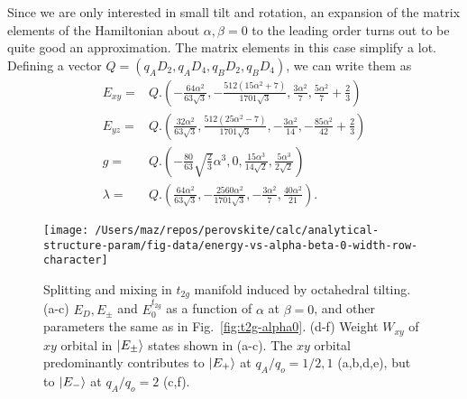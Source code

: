 \documentclass[a4paper,prb,twocolumn]{revtex4-1}  %
\begin{document}
Since we are only interested in small tilt and rotation,
an expansion of the matrix elements of the Hamiltonian about 
${\alpha,\beta=0}$
to the leading order turns out to be quite good an approximation.
The matrix elements in this case simplify a lot.
Defining a vector ${Q = \left( q_A D_2, q_A D_4, q_B D_2,q_B D_4  \right)}$,
 we can write them as
\begin{align}
E_{xy}=& Q.
\left(-\frac{64 \alpha ^2}{63 \sqrt{3}},-\frac{512 \left(15 \alpha ^2+7\right)}{1701 \sqrt{3}},\frac{3\alpha ^2}{7} ,\frac{5 \alpha ^2}{7}+\frac{2}{3}\right)\\
E_{yz}=& Q.
\left(\frac{32 \alpha ^2}{63 \sqrt{3}},\frac{512 \left(25 \alpha ^2-7\right)}{1701 \sqrt{3}},-\frac{3 \alpha ^2}{14},-\frac{85 \alpha ^2}{42}+\frac{2}{3}\right)\\
g=& Q.
\left(-\frac{80}{63} \sqrt{\frac{2}{3}} \alpha ^3,0,\frac{15 \alpha ^3}{14 \sqrt{2}},\frac{5 \alpha ^3}{2 \sqrt{2}}\right)\\
\lambda=& Q.
\left(\frac{64 \alpha ^2}{63 \sqrt{3}},-\frac{2560 \alpha ^2}{1701 \sqrt{3}},-\frac{3 \alpha ^2}{7},\frac{40 \alpha ^2}{21}\right).
\end{align}





\begin{figure}[htbp]
\begin{center}
\texttt{[image: /Users/maz/repos/perovskite/calc/analytical-structure-param/fig-data/energy-vs-alpha-beta-0-width-row-character]}
\caption{
Splitting and mixing in $t_{2g}$ manifold induced by octahedral tilting.
(a-c) 
$E_D, E_{\pm}$ and $E_0^{t_{2g}}$
as a function of $\alpha$
at 
$\beta=0$,
and other parameters the same as in Fig.~\ref{fig:t2g-alpha0}.
(d-f) Weight $W_{xy}$ of $xy$ orbital in 
$\ket{E_{\pm}}$ states 
shown in (a-c).
The $xy$ orbital predominantly
contributes to 
$\ket{E_{+}}$
at $q_A/q_o=1/2,1$ (a,b,d,e), 
but to   
$\ket{E_{-}}$
at $q_A/q_o=2$ (c,f).
}
\label{fig:t2g-beta0}
\end{center}
\end{figure}
\end{document}
